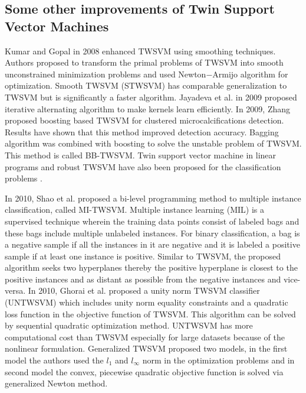 \documentclass[pdflatex,sn-mathphys]{sn-jnl}%
\theoremstyle{thmstyleone}%
\theoremstyle{thmstyletwo}%
\theoremstyle{thmstylethree}%
\begin{document}
\subsection{Some other improvements of Twin Support Vector Machines}

Kumar and Gopal \cite{kumar2008application} in 2008 enhanced TWSVM using smoothing techniques. Authors proposed to transform the primal problems of TWSVM into smooth unconstrained minimization problems and used Newton$-$Armijo algorithm for optimization. Smooth TWSVM (STWSVM) has comparable generalization to TWSVM but is significantly a faster algorithm. Jayadeva et al. \cite{khemchandani2009optimal} in 2009 proposed iterative alternating algorithm to make kernels learn efficiently. In 2009, Zhang \cite{zhang2009boosting} proposed boosting based TWSVM for clustered microcalcifications detection. Results have shown that this method improved detection accuracy. Bagging algorithm was combined with boosting to solve the unstable problem of TWSVM. This method is called BB-TWSVM. Twin support vector machine in linear programs and robust TWSVM \cite{TWSVM13} have also been proposed for the classification problems \cite{li2014twin}.

In 2010, Shao et al. \cite{shao2010multiple} proposed a bi-level programming method to multiple instance classification, called MI-TWSVM. Multiple instance learning (MIL) is a supervised technique wherein the training data points consist of labeled bags and these bags include multiple unlabeled instances. For binary classification, a bag is a negative sample if all the instances in it are negative and it is labeled a positive sample if at least one instance is positive.
Similar to TWSVM, the proposed algorithm seeks two hyperplanes thereby the positive hyperplane is closest to the positive instances and  as distant as possible from the negative instances and vice-versa. In 2010, Ghorai et al. \cite{ghorai2010unity} proposed a unity norm TWSVM classifier (UNTWSVM) which includes unity norm equality constraints and a quadratic loss function in the objective function of TWSVM. This algorithm can be solved by sequential quadratic optimization method. UNTWSVM has more computational cost than TWSVM especially for large datasets because of the nonlinear formulation.  Generalized TWSVM \cite{moosaei2021generalized} proposed two models, in the first model the authors used the $l_1$ and $l_\infty$ norm in the optimization problems and  in second model the convex, piecewise quadratic objective function is solved via generalized Newton method.
\end{document}
